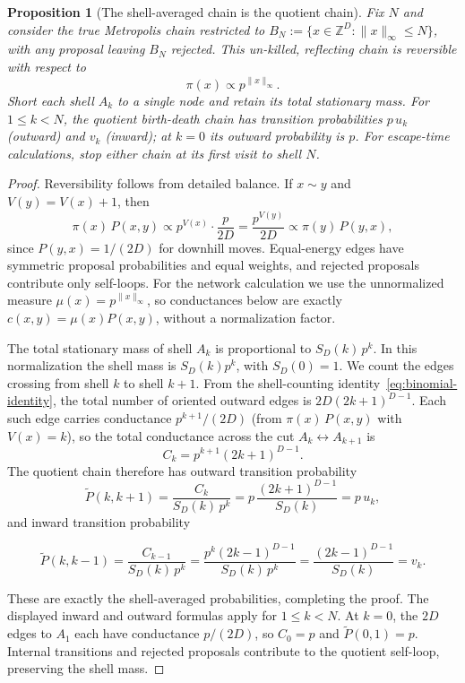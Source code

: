 \documentclass[conference]{IEEEtran}
\newtheorem{proposition}{Proposition}
\newcommand{\Z}{\mathbb{Z}}
\newcommand{\norm}[1]{\lVert #1\rVert}
\begin{document}
\begin{proposition}[The shell-averaged chain is the quotient chain]
\label{prop:quotient}
Fix $N$ and consider the true Metropolis chain restricted to
$B_N := \{x \in \Z^D : \norm{x}_\infty \le N\}$,
 with any proposal leaving $B_N$ rejected. This un-killed, reflecting
chain is reversible with respect to
\begin{equation}
\label{eq:pi}
\pi(x) \propto p^{\norm{x}_\infty}.
\end{equation}
 Short each shell $A_k$ to a single node and retain its total stationary
mass. For $1\le k<N$, the quotient birth-death chain has transition
probabilities $p\,u_k$ (outward) and $v_k$ (inward); at $k=0$ its
outward probability is $p$. For escape-time calculations, stop either
chain at its first visit to shell $N$. 
\end{proposition}

\begin{proof}
Reversibility follows from detailed balance.
If $x \sim y$ and $V(y) = V(x)+1$, then
\[
\pi(x)\,P(x,y) \propto p^{V(x)}\cdot\frac{p}{2D}
= \frac{p^{V(y)}}{2D}
\propto \pi(y)\,P(y,x),
\]
since $P(y,x) = 1/(2D)$ for downhill moves.
Equal-energy edges have symmetric proposal probabilities and equal
weights, and rejected proposals contribute only self-loops. For the
network calculation we use the unnormalized measure
$\mu(x)=p^{\norm{x}_\infty}$, so conductances below are exactly
$c(x,y)=\mu(x)P(x,y)$, without a normalization factor.

The total stationary mass of shell $A_k$ is proportional to $S_D(k)\,p^k$.
In this normalization the shell mass is $S_D(k)p^k$, with $S_D(0)=1$.
We count the edges crossing from shell $k$ to shell $k+1$.
From the shell-counting identity~\eqref{eq:binomial-identity},
the total number of oriented outward edges is $2D(2k+1)^{D-1}$.
Each such edge carries conductance $p^{k+1}/(2D)$ (from $\pi(x)\,P(x,y)$
with $V(x)=k$), so the total conductance across the cut
$A_k \leftrightarrow A_{k+1}$ is
\begin{equation}
\label{eq:conductance}
C_k = p^{k+1}(2k+1)^{D-1}.
\end{equation}
The quotient chain therefore has outward transition probability
\[
\widetilde{P}(k,k+1) = \frac{C_k}{S_D(k)\,p^k}
= p\,\frac{(2k+1)^{D-1}}{S_D(k)} = p\,u_k,
\]
and inward transition probability
{\small
\[
\widetilde{P}(k,k-1) = \frac{C_{k-1}}{S_D(k)\,p^k}
= \frac{p^k(2k-1)^{D-1}}{S_D(k)\,p^k}
= \frac{(2k-1)^{D-1}}{S_D(k)} = v_k.
\]
\par}
These are exactly the shell-averaged probabilities, completing the proof.
The displayed inward and outward formulas apply for $1\le k<N$.
At $k=0$, the $2D$ edges to $A_1$ each have conductance $p/(2D)$,
so $C_0=p$ and $\widetilde P(0,1)=p$. Internal transitions and rejected
proposals contribute to the quotient self-loop, preserving the shell mass.
\end{proof}
\end{document}
